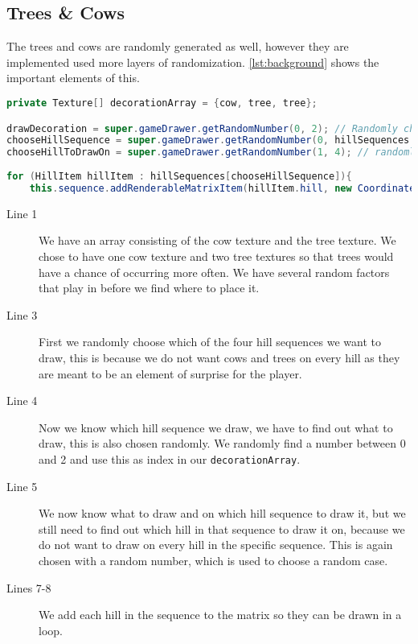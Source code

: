 \subsection{Trees \& Cows}

The trees and cows are randomly generated as well, however they are implemented used more layers of randomization. \autoref{lst:background} shows the important elements of this.

\begin{lstlisting}[language=java,firstnumber=1,caption={Selection of background.},label=lst:background]
private Texture[] decorationArray = {cow, tree, tree};

drawDecoration = super.gameDrawer.getRandomNumber(0, 2); // Randomly chosen which decoration to draw (cow = 0, tree = 1, tree = 2)
chooseHillSequence = super.gameDrawer.getRandomNumber(0, hillSequences.length-1); // randomly choose which hill sequence to draw
chooseHillToDrawOn = super.gameDrawer.getRandomNumber(1, 4); // randomly choose which hill to draw on (small_hill = 1, medium_hill = 2, large_hill = 3, larger_hill = 4)
    		
for (HillItem hillItem : hillSequences[chooseHillSequence]){
	this.sequence.addRenderableMatrixItem(hillItem.hill, new Coordinate(i + hillItem.x, hillItem.y, 0f));
\end{lstlisting}

\begin{description}
\item[Line 1] We have an array consisting of the cow texture and the tree texture. We chose to have one cow texture and two tree textures so that trees would have a chance of occurring more often. We have several random factors that play in before we find where to place it. 
\item[Line 3] First we randomly choose which of the four hill sequences we want to draw, this is because we do not want cows and trees on every hill as they are meant to be an element of surprise for the player. 
\item[Line 4] Now we know which hill sequence we draw, we have to find out what to draw, this is also chosen randomly. We randomly find a number between 0 and 2 and use this as index in our \lstinline|decorationArray|.
\item[Line 5] We now know what to draw and on which hill sequence to draw it, but we still need to find out which hill in that sequence to draw it on, because we do not want to draw on every hill in the specific sequence. This is again chosen with a random number, which is used to choose a random case. 
\item[Lines 7-8] We add each hill in the sequence to the matrix so they can be drawn in a loop. 
\end{description}

